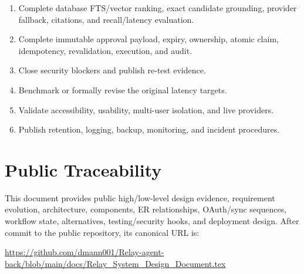 \documentclass[11pt]{article}
\begin{document}
\begin{enumerate}
  \item Complete database FTS/vector ranking, exact candidate grounding,
        provider fallback, citations, and recall/latency evaluation.
  \item Complete immutable approval payload, expiry, ownership, atomic claim,
        idempotency, revalidation, execution, and audit.
  \item Close security blockers and publish re-test evidence.
  \item Benchmark or formally revise the original latency targets.
  \item Validate accessibility, usability, multi-user isolation, and live providers.
  \item Publish retention, logging, backup, monitoring, and incident procedures.
\end{enumerate}

\section{Public Traceability}

This document provides public high/low-level design evidence, requirement
evolution, architecture, components, ER relationships, OAuth/sync sequences,
workflow state, alternatives, testing/security hooks, and deployment design.
After commit to the public repository, its canonical URL is:

\url{https://github.com/dmann001/Relay-agent-back/blob/main/docs/Relay_System_Design_Document.tex}
\end{document}
